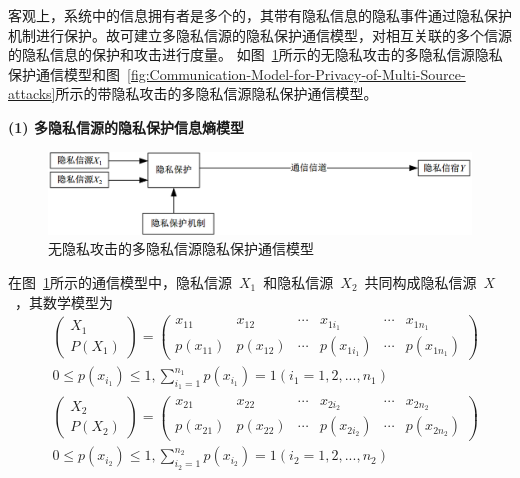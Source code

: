 客观上，系统中的信息拥有者是多个的，其带有隐私信息的隐私事件通过隐私保护机制进行保护。故可建立多隐私信源的隐私保护通信模型，对相互关联的多个信源的隐私信息的保护和攻击进行度量。 如图~\ref{fig:Communication-Model-for-Privacy-of-Multi-Source}所示的无隐私攻击的多隐私信源隐私保护通信模型和图~\ref{fig:Communication-Model-for-Privacy-of-Multi-Source-attacks}所示的带隐私攻击的多隐私信源隐私保护通信模型。

\textbf{(1) 多隐私信源的隐私保护信息熵模型}

\begin{figure}[htbp]
	\centering
	\includegraphics[width = 0.95\linewidth]{./figures/Communication-Model-for-Privacy-of-Multi-Source.png}
	\caption{无隐私攻击的多隐私信源隐私保护通信模型}
	\label{fig:Communication-Model-for-Privacy-of-Multi-Source}
\end{figure}

在图~\ref{fig:Communication-Model-for-Privacy-of-Multi-Source}所示的通信模型中，隐私信源~$X_{1}$~和隐私信源~$X_{2}$~共同构成隐私信源~$X$~，其数学模型为
\begin{equation}
\label{eq:privacy-source1-probability}
\begin{split}
&\begin{pmatrix}
X_{1}\\ 
P(X_{1})
\end{pmatrix}=\begin{pmatrix}
x_{11} & x_{12} & \cdots  & x_{1i_{1}} & \cdots  & x_{1n_{1}}\\ 
p(x_{11})& p(x_{12}) & \cdots & p(x_{1i_{1}}) & \cdots & p(x_{1n_{1}})
\end{pmatrix} \\
&0\leqslant p(x_{i_{1}})\leqslant 1,\sum_{i_{1}=1}^{n_{1}}p(x_{i_{1}})=1(i_{1}=1,2,...,n_{1})
\end{split}
\end{equation}
\begin{equation}
\label{eq:privacy-source2-probability}
\begin{split}
&\begin{pmatrix}
X_{2}\\ 
P(X_{2})
\end{pmatrix}=\begin{pmatrix}
x_{21} & x_{22} & \cdots  & x_{2i_{2}} & \cdots  & x_{2n_{2}}\\ 
p(x_{21})& p(x_{22}) & \cdots & p(x_{2i_{2}}) & \cdots & p(x_{2n_{2}})
\end{pmatrix} \\
&0\leqslant p(x_{i_{2}})\leqslant 1,\sum_{i_{2}=1}^{n_{2}}p(x_{i_{2}})=1(i_{2}=1,2,...,n_{2})
\end{split}
\end{equation}

